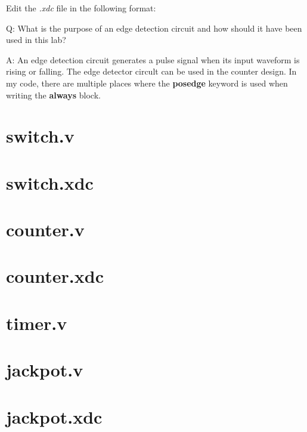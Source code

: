 \documentclass[11pt,letterpaper,titlepage]{article}
\begin{document}
Edit the \textit{.xdc} file in the following format:



Q: What is the purpose of an edge detection circuit and how should it have been used in this lab?

A: An edge detection circuit generates a pulse signal when its input waveform is rising or falling. The edge detector circult can be used in the counter design. In my code, there are multiple places where the \textbf{posedge} keyword is used when writing the \textbf{always} block.

\newpage

\begin{appendices}

\section{switch.v}
\label{appendix:verilog_switch}


\section{switch.xdc}
\label{appendix:xdc_switch}


\newpage

\section{counter.v}
\label{appendix:verilog_counter}


\section{counter.xdc}
\label{appendix:xdc_counter}


\section{timer.v}
\label{appendix:verilog_timer}


\newpage

\section{jackpot.v}
\label{appendix:verilog_jackpot}


\section{jackpot.xdc}
\label{appendix:xdc_jackpot}


\end{appendices} 

\end{document}
